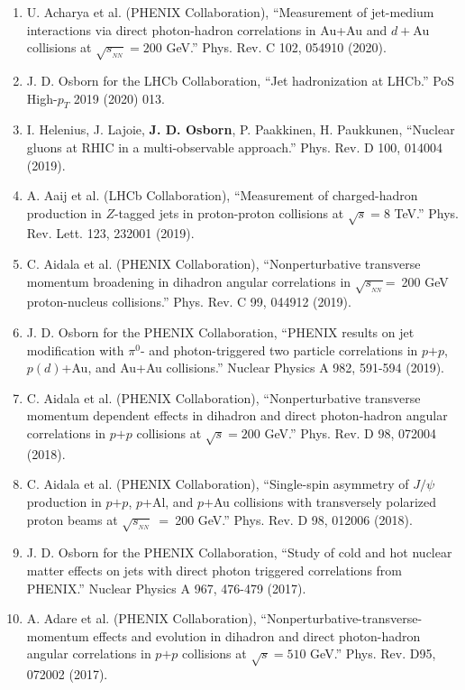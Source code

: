 \documentclass[11pt]{article}
\newcommand{\snn}{\sqrt{s_{_{NN}}}}
\begin{document}
\begin{flushleft}
\begin{center}
\begin{enumerate}
	\item U. Acharya et al. (PHENIX Collaboration), ``Measurement of jet-medium interactions via direct photon-hadron correlations in Au+Au and $d+$Au collisions at $\sqrt{s_{_{NN}}}=200$ GeV.'' Phys. Rev. C 102, 054910 (2020).
	
	\item J. D. Osborn for the LHCb Collaboration, ``Jet hadronization at LHCb.'' PoS High-$p_T$ 2019 (2020) 013.
	
	\item I. Helenius, J. Lajoie, {\bf{J. D. Osborn}}, P. Paakkinen, H. Paukkunen, ``Nuclear gluons at RHIC in a multi-observable approach.'' Phys. Rev. D 100, 014004 (2019).
	
	\item A. Aaij et al. (LHCb Collaboration), ``Measurement of charged-hadron production in $Z$-tagged jets in proton-proton collisions at $\sqrt{s}=8$ TeV.'' Phys. Rev. Lett. 123, 232001 (2019).
	
	\item C. Aidala et al. (PHENIX Collaboration), ``Nonperturbative transverse momentum broadening in dihadron angular correlations in $\sqrt{s_{_{NN}}}$=~200 GeV proton-nucleus collisions.''  Phys. Rev. C 99, 044912 (2019).

	\item J. D. Osborn for the PHENIX Collaboration, ``PHENIX results on jet modification with $\pi^0$- and photon-triggered two particle correlations in $p$$+$$p$, $p(d)$+Au, and Au+Au collisions.'' Nuclear Physics A 982, 591-594 (2019).

	\item C. Aidala et al. (PHENIX Collaboration), ``Nonperturbative transverse momentum dependent effects in dihadron and direct photon-hadron angular correlations in $p$$+$$p$ collisions at $\sqrt{s}=200$ GeV.'' Phys. Rev. D 98, 072004 (2018).
		
		
	\item C. Aidala et al. (PHENIX Collaboration), ``Single-spin asymmetry of $J/\psi$ production in $p$$+$$p$, $p$+Al, and $p$$+$Au collisions with transversely polarized proton beams at $\snn$~=~200 GeV.'' Phys. Rev. D 98, 012006 (2018).
	
	\item J. D. Osborn for the PHENIX Collaboration, ``Study of cold and hot nuclear matter effects on jets with direct photon triggered correlations from PHENIX.'' Nuclear Physics A 967, 476-479 (2017).
	
	\item A. Adare et al. (PHENIX Collaboration), ``Nonperturbative-transverse-momentum effects and evolution in dihadron and direct photon-hadron angular correlations in $p$$+$$p$ collisions at $\sqrt{s}=510$ GeV.''  Phys. Rev. D95, 072002 (2017).
	
\end{enumerate}
\end{center}
\end{flushleft}
\end{document}

